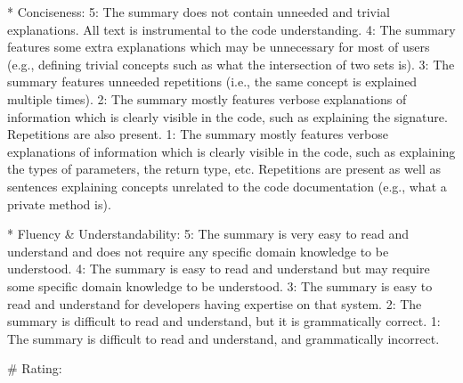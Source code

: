 * Conciseness:
	5: The summary does not contain unneeded and trivial explanations. All text is instrumental to the code understanding.
	4: The summary features some extra explanations which may be unnecessary for most of users (e.g., defining trivial concepts such as what the intersection of two sets is).
	3: The summary features unneeded repetitions (i.e., the same concept is explained multiple times).
	2: The summary mostly features verbose explanations of information which is clearly visible in the code, such as explaining the signature. Repetitions are also present.
	1: The summary mostly features verbose explanations of information which is clearly visible in the code, such as explaining the types of parameters, the return type, etc. Repetitions are present as well as sentences explaining concepts unrelated to the code documentation (e.g., what a private method is).
	
* Fluency & Understandability:
	5: The summary is very easy to read and understand and does not require any specific domain knowledge to be understood.
	4: The summary is easy to read and understand but may require some specific domain knowledge to be understood.
	3: The summary is easy to read and understand for developers having expertise on that system.
	2: The summary is difficult to read and understand, but it is grammatically correct.
	1: The summary is difficult to read and understand, and grammatically incorrect.
	
# Rating: